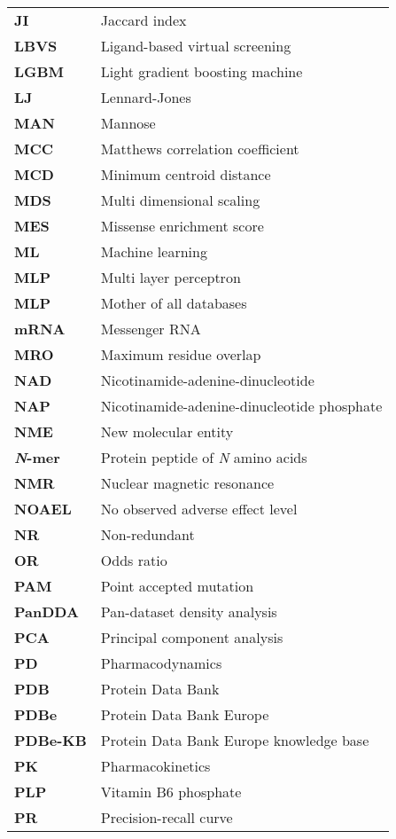 \begin{longtable}[l]{@{}p{2.5cm}p{12cm}@{}}
\textbf{JI} & Jaccard index \\
\textbf{LBVS} & Ligand-based virtual screening \\
\textbf{LGBM} & Light gradient boosting machine \\
\textbf{LJ} & Lennard-Jones \\
\textbf{MAN} & Mannose \\
\textbf{MCC} & Matthews correlation coefficient \\
\textbf{MCD} & Minimum centroid distance \\
\textbf{MDS} & Multi dimensional scaling \\
\textbf{MES} & Missense enrichment score \\
\textbf{ML} & Machine learning \\
\textbf{MLP} & Multi layer perceptron \\
\textbf{MLP} & Mother of all databases \\
\textbf{mRNA} & Messenger RNA \\
\textbf{MRO} & Maximum residue overlap \\
\textbf{NAD} & Nicotinamide-adenine-dinucleotide \\
\textbf{NAP} & Nicotinamide-adenine-dinucleotide phosphate \\
\textbf{NME} & New molecular entity \\
\textbf{\textit{N}-mer} & Protein peptide of \textit{N} amino acids \\
\textbf{NMR} & Nuclear magnetic resonance \\
\textbf{NOAEL} & No observed adverse effect level \\
\textbf{NR} & Non-redundant \\
\textbf{OR} & Odds ratio \\
\textbf{PAM} & Point accepted mutation \\
\textbf{PanDDA} & Pan-dataset density analysis \\
\textbf{PCA} & Principal component analysis \\
\textbf{PD} & Pharmacodynamics \\ 
\textbf{PDB} & Protein Data Bank \\
\textbf{PDBe} & Protein Data Bank Europe \\
\textbf{PDBe-KB} & Protein Data Bank Europe knowledge base \\
\textbf{PK} & Pharmacokinetics \\
\textbf{PLP} & Vitamin B6 phosphate \\
\textbf{PR} & Precision-recall curve \\

\end{longtable}
